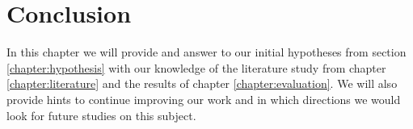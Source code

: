 \chapter{Conclusion}
\label{chapter:conclusion}
In this chapter we will provide and answer to our initial hypotheses from section \ref{chapter:hypothesis} with our knowledge of the literature study from chapter \ref{chapter:literature} and the results of chapter \ref{chapter:evaluation}. We will also provide hints to continue improving our work and in which directions we would look for future studies on this subject.

